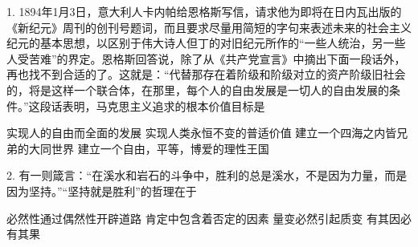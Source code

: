 1. 1894年1月3日，意大利人卡内帕给恩格斯写信，请求他为即将在日内瓦出版的《新纪元》周刊的创刊号题词，而且要求尽量用简短的字句来表述未来的社会主义纪元的基本思想，以区别于伟大诗人但丁的对旧纪元所作的“一些人统治，另一些人受苦难”的界定。恩格斯回答说，除了从《共产党宣言》中摘出下面一段话外，再也找不到合适的了。这就是：“代替那存在着阶级和阶级对立的资产阶级旧社会的，将是这样一个联合体，在那里，每个人的自由发展是一切人的自由发展的条件。”这段话表明，马克思主义追求的根本价值目标是
\begin{choices}
	 实现人的自由而全面的发展
	 实现人类永恒不变的普适价值
	 建立一个四海之内皆兄弟的大同世界
	 建立一个自由，平等，博爱的理性王国
\end{choices}
2. 有一则箴言：“在溪水和岩石的斗争中，胜利的总是溪水，不是因为力量，而是因为坚持。”“坚持就是胜利”的哲理在于
\begin{choices}
	 必然性通过偶然性开辟道路
	 肯定中包含着否定的因素
	 量变必然引起质变
	 有其因必有其果
\end{choices}


